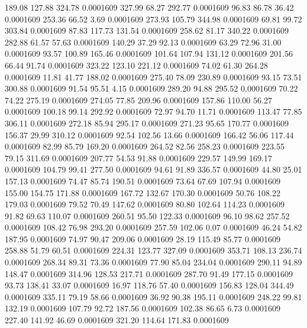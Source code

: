  189.08  127.88  324.78   0.0001609
 327.99   68.27  292.77   0.0001609
  96.83   86.78   36.42   0.0001609
 253.36   66.52    3.69   0.0001609
 273.93  105.79  344.98   0.0001609
  69.81   99.72  303.84   0.0001609
  87.83  117.73  131.54   0.0001609
 258.62   81.17  340.22   0.0001609
 282.88   61.57   57.63   0.0001609
 140.29   37.29   92.13   0.0001609
  63.29   72.96   31.00   0.0001609
  93.57  100.89  165.46   0.0001609
 101.64  107.94  131.12   0.0001609
 201.56   66.44   91.74   0.0001609
 323.22  123.10  221.12   0.0001609
  74.02   61.30  264.28   0.0001609
  11.81   41.77  188.02   0.0001609
 275.40   78.09  230.89   0.0001609
  93.15   73.51  300.88   0.0001609
  91.54   95.51    4.15   0.0001609
 289.20   94.88  295.52   0.0001609
  70.22   74.22  275.19   0.0001609
 274.05   77.85  209.96   0.0001609
 157.86  110.00   56.27   0.0001609
 100.18   99.14  292.92   0.0001609
  72.97   94.70   11.71   0.0001609
 113.47   77.85  306.11   0.0001609
 272.18   85.94  295.17   0.0001609
 271.23   95.65  170.77   0.0001609
 156.37   29.99  310.12   0.0001609
  92.54  102.56   13.66   0.0001609
 166.42   56.06  117.44   0.0001609
  82.99   85.79  169.20   0.0001609
 264.52   82.56  258.23   0.0001609
 223.55   79.15  311.69   0.0001609
 207.77   54.53   91.88   0.0001609
 229.57  149.99  169.17   0.0001609
 104.79   99.41  277.50   0.0001609
  94.61   91.89  336.57   0.0001609
  44.80   25.01  157.13   0.0001609
  74.47   85.74  190.51   0.0001609
  73.64   67.69  107.94   0.0001609
 155.00  154.75  171.88   0.0001609
 167.72  132.67  170.30   0.0001609
  50.76  108.22  179.03   0.0001609
  79.52   70.49  147.62   0.0001609
  80.80  102.64  114.23   0.0001609
  91.82   69.63  110.07   0.0001609
 260.51   95.50  122.33   0.0001609
  96.10   98.62  257.52   0.0001609
 108.42   76.98  293.20   0.0001609
 257.59  102.06    0.07   0.0001609
  46.24   54.82  187.95   0.0001609
  74.97   90.47  209.06   0.0001609
  28.19  115.49   85.77   0.0001609
 258.88   51.79   60.51   0.0001609
 224.31  123.77  327.09   0.0001609
 353.71  108.13  236.74   0.0001609
 268.34   89.31   73.36   0.0001609
  77.90   85.04  234.04   0.0001609
 290.11   94.89  148.47   0.0001609
 314.96  128.53  217.71   0.0001609
 287.70   91.49  177.15   0.0001609
  93.73  138.41   33.07   0.0001609
  16.97  118.76   57.40   0.0001609
 156.83  128.04  344.49   0.0001609
 335.11   79.19   58.66   0.0001609
  36.92   90.38  195.11   0.0001609
 248.22   99.81  132.19   0.0001609
 107.79   92.72  187.56   0.0001609
 102.38   86.65    6.73   0.0001609
 227.40  141.92   46.69   0.0001609
 321.20  114.64  171.83   0.0001609
